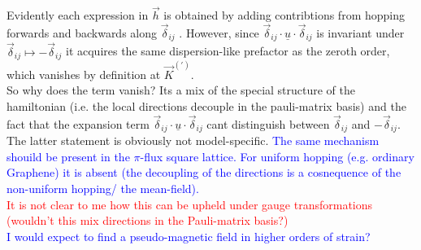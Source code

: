 \documentclass[../../../main.tex]{subfiles}
\begin{document}
Evidently each expression in $\vec{h}$ is obtained by adding contribtions from hopping forwards and backwards along $\vec{\delta}_{ij}$ . However, since $\vec{\delta}_{ij} \cdot \underline{u} \cdot \vec{\delta}_{ij}$ is invariant under $\vec{\delta}_{ij} \mapsto -\vec{\delta}_{ij}$ it acquires the same dispersion-like prefactor as the zeroth order, which vanishes by definition at $\vec{K}^{(\prime)}$. \\

So why does the term vanish? Its a mix of the special structure of the hamiltonian (i.e. the local directions decouple in the pauli-matrix basis) and the fact that the expansion term $\vec{\delta}_{ij} \cdot \underline{u} \cdot \vec{\delta}_{ij}$ cant distinguish between $\vec{\delta}_{ij}$ and $-\vec{\delta}_{ij}$. The latter statement is obviously not model-specific. \textcolor{blue}{The same mechanism shouild be present in the $\pi$-flux square lattice. For uniform hopping (e.g. ordinary Graphene) it is absent (the decoupling of the directions is a cosnequence of the non-uniform hopping/ the mean-field).} \\

\textcolor{red}{It is not clear to me how this can be upheld under gauge transformations (wouldn't this mix directions in the Pauli-matrix basis?)} \\

\textcolor{blue}{I would expect to find a pseudo-magnetic field in higher orders of strain?}
\end{document}
